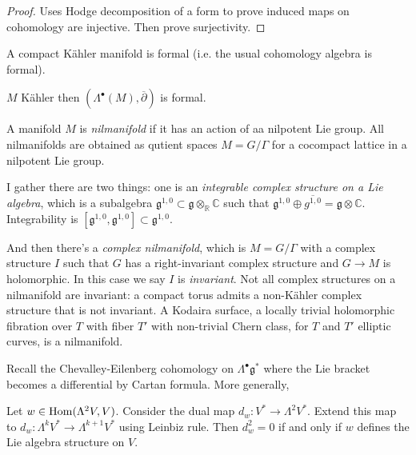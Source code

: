 \begin{proof}
Uses Hodge decomposition of a form to prove
induced maps
on cohomology are injective. Then prove
surjectivity.
\end{proof}

\begin{lemma}
\label{lemma-kahler-formal}
A compact Kähler manifold is formal (i.e. the
usual cohomology algebra
is formal).
\end{lemma}

\begin{theorem}
\label{theorem-kahler-dolbeault-formal}
$M$ Kähler then
$(\Lambda^\bullet(M),\overline{\partial})$ is
formal.
\end{theorem}

\medskip\noindent
A manifold $M$ is {\it nilmanifold} if it has
an action of aa nilpotent Lie
group. All nilmanifolds are obtained as
qutient spaces $M=G/\Gamma$
for a cocompact lattice in a nilpotent Lie
group.

I gather there are two things:
one is an {\it integrable complex structure
on a Lie algebra}, which
is a subalgebra
$\mathfrak{g}^{1,0}\subset \mathfrak{g}
\otimes_\mathbb{R} \mathbb{C}$
such that $\mathfrak{g}^{1,0} \oplus
\overline{g^{1,0}}
=\mathfrak{g} \otimes \mathbb{C}$.
Integrability is
$[\mathfrak{g}^{1,0},\mathfrak{g}^{1,0}]
\subset \mathfrak{g}^{1,0}$.

And then there's a {\it complex nilmanifold},
which is $M=G/\Gamma$
with a complex structure $I$ such that $G$
has
a right-invariant complex structure and $G
\to M$ is holomorphic.
In this case we say $I$ is {\it invariant}.
Not all complex structures on a nilmanifold
are invariant:
a compact torus admits a non-Kähler complex
structure that is not invariant.
A Kodaira surface, a locally trivial
holomorphic fibration over $T$ with fiber
$T'$ with non-trivial Chern class, for $T$
and $T'$ elliptic curves,
is a nilmanifold.

Recall the Chevalley-Eilenberg cohomology
on $\Lambda^\bullet\mathfrak{g}^*$ where the
Lie bracket becomes
a differential by Cartan formula.
More generally,

\begin{proposition}
\label{proposition-cheva-eilen-diffe}
Let $w \in \mathop{\mathrm{Hom}}\nolimits(\Lambda^2V,V)$.
Consider the dual map $d_w:V^* \to
\Lambda^2V^*$.
Extend this map to $d_w:\Lambda^kV^*  \to
\Lambda^{k+1}V^*$
using Leinbiz rule. Then $d^2_w=0$ if and
only if $w$
defines the Lie algebra structure on $V$.
\end{proposition}


